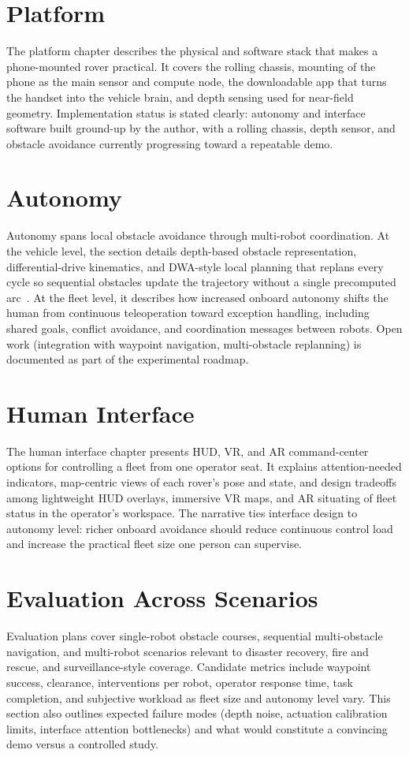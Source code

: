 \documentclass[11pt,a4paper]{article}
\begin{document}
\section{Platform}
\label{sec:platform}
The platform chapter describes the physical and software stack that makes a phone-mounted rover practical.
It covers the rolling chassis, mounting of the phone as the main sensor and compute node, the downloadable app that turns the handset into the vehicle brain, and depth sensing used for near-field geometry.
Implementation status is stated clearly: autonomy and interface software built ground-up by the author, with a rolling chassis, depth sensor, and obstacle avoidance currently progressing toward a repeatable demo.

\section{Autonomy}
\label{sec:autonomy}
Autonomy spans local obstacle avoidance through multi-robot coordination.
At the vehicle level, the section details depth-based obstacle representation, differential-drive kinematics, and DWA-style local planning that replans every cycle so sequential obstacles update the trajectory without a single precomputed arc~\citep{fox1997dwa}.
At the fleet level, it describes how increased onboard autonomy shifts the human from continuous teleoperation toward exception handling, including shared goals, conflict avoidance, and coordination messages between robots.
Open work (integration with waypoint navigation, multi-obstacle replanning) is documented as part of the experimental roadmap.

\section{Human Interface}
\label{sec:hmi}
The human interface chapter presents HUD, VR, and AR command-center options for controlling a fleet from one operator seat.
It explains attention-needed indicators, map-centric views of each rover's pose and state, and design tradeoffs among lightweight HUD overlays, immersive VR maps, and AR situating of fleet status in the operator's workspace.
The narrative ties interface design to autonomy level: richer onboard avoidance should reduce continuous control load and increase the practical fleet size one person can supervise.

\section{Evaluation Across Scenarios}
\label{sec:evaluation}
Evaluation plans cover single-robot obstacle courses, sequential multi-obstacle navigation, and multi-robot scenarios relevant to disaster recovery, fire and rescue, and surveillance-style coverage.
Candidate metrics include waypoint success, clearance, interventions per robot, operator response time, task completion, and subjective workload as fleet size and autonomy level vary.
This section also outlines expected failure modes (depth noise, actuation calibration limits, interface attention bottlenecks) and what would constitute a convincing demo versus a controlled study.
\end{document}
